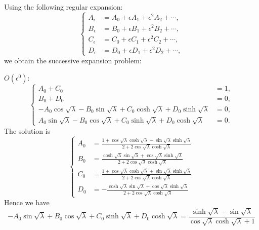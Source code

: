 \documentclass{article}
\begin{document}
Using the following regular expansion:
\begin{equation}
    \left\{\begin{aligned}
        A_\epsilon &= A_0 + \epsilon A_1 + \epsilon^2 A_2 + \cdots, \\
        B_\epsilon &= B_0 + \epsilon B_1 + \epsilon^2 B_2 + \cdots, \\
        C_\epsilon &= C_0 + \epsilon C_1 + \epsilon^2 C_2 + \cdots, \\
        D_\epsilon &= D_0 + \epsilon D_1 + \epsilon^2 D_2 + \cdots, 
    \end{aligned}\right.
\end{equation}
we obtain the successive expansion problem:

\noindent
$O(\epsilon^0)$:
\begin{equation}
    \left\{\begin{aligned}
        A_0 + C_0 &= 1, \\
        B_0 + D_0 &= 0, \\
        - A_0 \cos{\sqrt{\lambda}} - B_0 \sin{\sqrt{\lambda}} + C_0 \cosh{\sqrt{\lambda}} + D_0 \sinh{\sqrt{\lambda}} &= 0, \\
        A_0 \sin{\sqrt{\lambda}} - B_0 \cos{\sqrt{\lambda}} + C_0 \sinh{\sqrt{\lambda}} + D_0 \cosh{\sqrt{\lambda}} &= 0.
    \end{aligned}\right.
\end{equation}
The solution is
\begin{equation}
    \left\{\begin{aligned}
        A_0 &= \frac{1 + \cos\sqrt{\lambda} \cosh\sqrt{\lambda} - \sin\sqrt{\lambda} \sinh\sqrt{\lambda} }{2 + 2 \cos\sqrt{\lambda} \cosh\sqrt{\lambda} } \\
        B_0 &= \frac{\cosh\sqrt{\lambda} \sin\sqrt{\lambda} + \cos\sqrt{\lambda} \sinh\sqrt{\lambda} }{2 + 2 \cos\sqrt{\lambda} \cosh\sqrt{\lambda} } \\
        C_0 &= \frac{1 + \cos\sqrt{\lambda} \cosh\sqrt{\lambda} + \sin\sqrt{\lambda} \sinh\sqrt{\lambda} }{2 + 2 \cos\sqrt{\lambda} \cosh\sqrt{\lambda} } \\
        D_0 &= -\frac{\cosh\sqrt{\lambda} \sin\sqrt{\lambda} + \cos\sqrt{\lambda} \sinh\sqrt{\lambda} }{2 + 2 \cos\sqrt{\lambda} \cosh\sqrt{\lambda} }
    \end{aligned}\right.
\end{equation}
Hence we have
\begin{equation}
    - A_0 \sin{\sqrt{\lambda}} + B_0 \cos{\sqrt{\lambda}} + C_0 \sinh{\sqrt{\lambda}} + D_0 \cosh{\sqrt{\lambda}} = \frac{\sinh\sqrt{\lambda }-\sin\sqrt{\lambda }}{\cos\sqrt{\lambda } \cosh\sqrt{\lambda }+1}
\end{equation}
\end{document}
